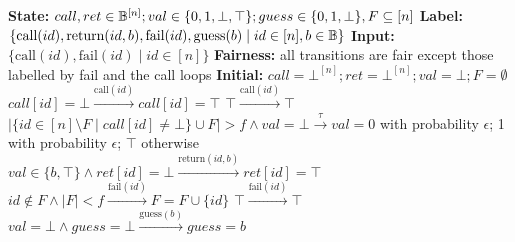 \begin{transys}
    \label{PLTS:WCC}
    \caption{Encoding of \textsf{WCC}}
    \begin{algorithmic}
        \State \textbf{State:} $call, ret \in \mathbb{B}^{[n]}; val \in \{0,1,\bot,\top\};
        guess \in \{0,1,\bot\}, F \subseteq [n]$
        \State \textbf{Label:} $\{\text{call}(id), \text{return}(id,b), \text{fail}(id),
        \text{guess}(b) \mid id \in [n], b \in \mathbb{B}\}$
        \State \textbf{Input:} $\{\text{call}(id), \text{fail}(id) \mid id \in [n]\}$
        \State \textbf{Fairness:} all transitions are fair except those labelled by fail and the
        call loops
        \State \textbf{Initial:} $call = \bot^{[n]}; ret = \bot^{[n]}; val = \bot; F = \emptyset$
        \medskip
        \State
        $call[id] = \bot
        \xrightarrow{\text{call}(id)}
        call[id] = \top$
        \State
        $\top
        \xrightarrow{\text{call}(id)}
        \top$ 
        \State
        $|\{id \in [n] \setminus F \mid call[id] \ne \bot\} \cup F| > f
        \wedge val = \bot
        \xrightarrow{\tau}
        val = 0$ with probability $\epsilon$; 1 with probability $\epsilon$; $\top$ otherwise
        \State
        $val \in \{b,\top\}
        \wedge ret[id] = \bot
        \xrightarrow{\text{return}(id,b)}
        ret[id] = \top$ 
        \State
        $id \not\in F \wedge |F| < f
        \xrightarrow{\text{fail}(id)}
        F = F \cup \{id\}$
        \State
        $\top
        \xrightarrow{\text{fail}(id)}
        \top$ 
        \State
        $val = \bot \wedge guess = \bot
        \xrightarrow{\text{guess}(b)}
        guess = b$
    \end{algorithmic}
\end{transys}

